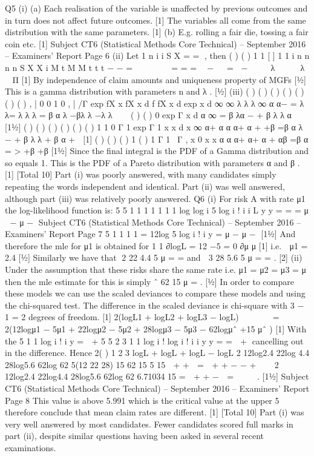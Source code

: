   Q5 (i) (a) Each realisation of the variable is unaffected by previous outcomes and
in turn does not affect future outcomes. [1]
The variables all come from the same distribution with the same
parameters. [1]
(b) E.g. rolling a fair die, tossing a fair coin etc. [1]
Subject CT6 (Statistical Methods Core Technical) – September 2016 – Examiners’ Report
Page 6
(ii) Let
1
n
i
i
S X
=
  = , then
( ) ( )
1
1
[ ] 1 1 i
n n n
n
S X X
i
M t M M t t t
− −
=
        = = =  −   = −    λ    λ  
Π [1]
By independence of claim amounts and uniqueness property of MGFs [½]
This is a gamma distribution with parameters n and λ . [½]
(iii) ( ) ( ) ( ) ( )
( ) ( ) ( )
, |
  0 0
1
0
, |
  /Γ exp
fX x fX x d f fX x d
exp x d
∞ ∞
λ λ λ
∞
α α−
= λ λ= λ λ λ
= β α λ −βλ λ −λ λ
 

( ) { ( ) }
0
exp
Γ
x d
α ∞
= β λα − + β λ λ
α  [1½]
( ) ( )
( )
( )
( ) { ( ) }
1
1
0
Γ 1
\Γ exp
Γ 1
x
x d
x
∞ α+
  α α
α+
  α + +β
=β α λ − + β λ λ
+ β α +  [1]
( ) ( )
( ) 1 ( ) 1
Γ 1
\ Γ , x 0
x x
α
α
α+ α+
  α + αβ =β α = >
  +β +β
[1½]
Since the final integral is the PDF of a Gamma distribution and so equals 1.
This is the PDF of a Pareto distribution with parameters α and β . [1]
[Total 10]
Part (i) was poorly answered, with many candidates simply repeating the
words independent and identical. Part (ii) was well answered, although part
(iii) was relatively poorly answered.
Q6 (i) For risk A with rate μ1 the log-likelihood function is:
  5 5
1 1 1 1 1
1 1
log log i 5 log i !
  i i
L y y
= =
  = μ  − μ −
Subject CT6 (Statistical Methods Core Technical) – September 2016 – Examiners’ Report
Page 7
5
1 1 1
1
= 12log 5 log i !
  i
y
=
  μ − μ − [1½]
And therefore the mle for μ1 is obtained for
1 1
∂logL = 12 −5 = 0
∂μ μ
[1]
i.e. 
μ1 = 2.4 [½]
Similarly we have that 2
22 4.4
5
μ = = and 
3
28 5.6
5
μ = = . [2]
(ii) Under the assumption that these risks share the same rate i.e. μ1 = μ2 = μ3 = μ
then the mle estimate for this is simply ˆ 62
15
μ = . [½]
In order to compare these models we can use the scaled deviances to compare
these models and using the chi-squared test.
The difference in the scaled deviance is chi-square with 3 − 1 = 2 degrees of
freedom. [1]
2(logL1 + logL2 + logL3 − logL)
     
= 2(12logμ1 − 5μ1 + 22logμ2 − 5μ2 + 28logμ3 − 5μ3 − 62logμˆ +15 μˆ ) [1]
With the
5
1
1
log i !
  i
y
= 
+
  5 5
2 3
1 1
log i ! log i !
  i i
y y
= =
   + cancelling out in the difference.
Hence
2( ) 1 2 3 logL + logL + logL − logL
2 12log2.4 22log 4.4 28log5.6 62log 62 5(12 22 28) 15 62
15 5 15
 + + 
=  + + − − + 
 
2 12log2.4 22log4.4 28log5.6 62log 62 6.71034
15
=  + + −  =  
 
. [1½]
Subject CT6 (Statistical Methods Core Technical) – September 2016 – Examiners’ Report
Page 8
This value is above 5.991 which is the critical value at the upper 5%
therefore conclude that mean claim rates are different. [1]
[Total 10]
Part (i) was very well answered by most candidates. Fewer candidates
scored full marks in part (ii), despite similar questions having been asked in
several recent examinations.
